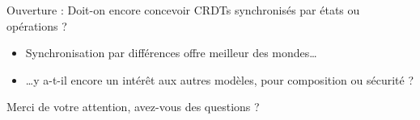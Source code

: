 \begin{frame}{Ouverture : Doit-on encore concevoir CRDTs synchronisés par états ou opérations ?}
  \begin{table}[!ht]
  \end{table}
  \begin{itemize}
    \item Synchronisation par différences offre meilleur des mondes\dots
    \item \dots y a-t-il encore un intérêt aux autres modèles, \eg pour composition ou sécurité ?
  \end{itemize}
\end{frame}

\begin{frame}[standout]
  Merci de votre attention, avez-vous des questions ?
  \vspace{3em}
  \begin{center}
    \ccby
  \end{center}
\end{frame}
